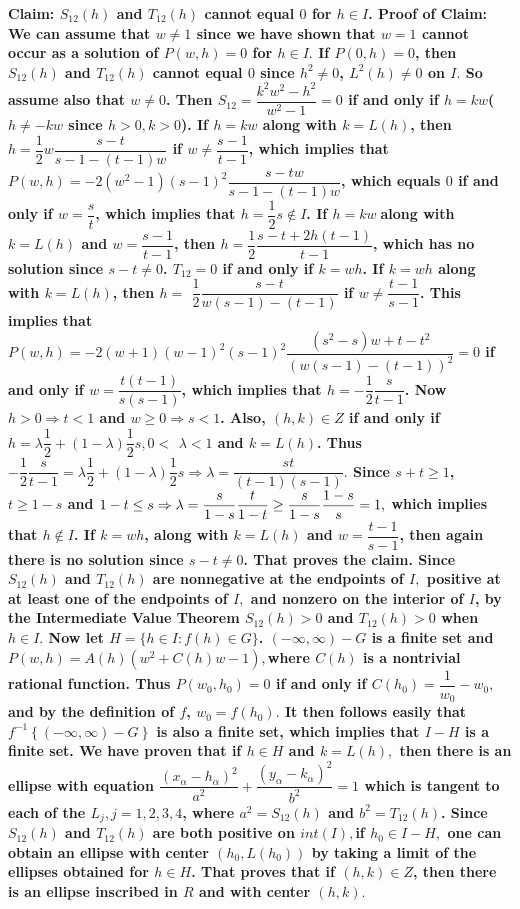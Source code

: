 \newline \bf Claim: \rm $S_{12}(h)$ and $T_{12}(h)$ cannot equal $0$ for $h\in I$. 
\newline \bf Proof of Claim: \rm We can assume that $w\neq 1$ since we have shown that $w=1$ \bf cannot \rm occur as a solution of $P(w,h)=0$ for $h\in I.$ If $P(0,h)=0$, then $S_{12}(h)$ and $T_{12}(h)$ cannot equal $0$ since $h^{2}\neq 0$, $L^{2}(h)\neq 0$ on $I.$ So assume also that $w\neq 0$. Then $S_{12}=\dfrac{k^{2}w^{2}-h^{2}}{w^{2}-1}=\allowbreak 0$ if and only if $h=kw$($h\neq -kw$ since $h>0,k>0$). If $h=kw$ along with $k=L(h)$, then $h=\dfrac{1}{2}w\dfrac{s-t}{s-1-(t-1)w}$ if $w\neq \dfrac{s-1}{t-1}$, which implies that $P(w,h)=-2(w^2-1) \left( s-1\right) ^{2}\dfrac{s-tw}{s-1-(t-1)w}$, which equals $0$ if and only if $w=\dfrac{s}{t}$, which implies that $h=\dfrac{1}{2}s\notin I$. If $h=kw\;$along with $k=L(h)$ and $w=\dfrac{s-1}{t-1}$, then $h=\dfrac{1}{2}\dfrac{s-t+2h(t-1)}{t-1}$, which has no solution since $s-t\neq 0$. $T_{12}=0$ if and only if $k=wh$. If $k=wh$ along with $k=L(h)$, then $h=\allowbreak $ $\dfrac{1}{2}\dfrac{s-t}{w(s-1)-(t-1)}$ if $w\neq \dfrac{t-1}{s-1}$. This implies that $P(w,h)=-2\left( w+1\right) \left( w-1\right) ^{2}\left( s-1\right) ^{2}\dfrac{(s^{2}-s)w+t-t^{2}}{\left( w(s-1)-(t-1)\right) ^{2}}=0$ if and only if $w=\dfrac{t(t-1)}{s(s-1)}$, which implies that $h=\allowbreak -\dfrac{1}{2}\dfrac{s}{t-1}$. Now $h>0\Rightarrow t<1$ and $w\geq 0\Rightarrow s<1$. Also, $(h,k)\in Z$ if and only if $h=\lambda \dfrac{1}{2}+(1-\lambda )\dfrac{1}{2}s,0<$ $\lambda <1$ and $k=L(h)$. Thus $-\dfrac{1}{2}\dfrac{s}{t-1}=\lambda \dfrac{1}{2}+(1-\lambda )\dfrac{1}{2}s\Rightarrow \lambda =\dfrac{s\allowbreak t}{\left( t-1\right) \left( s-1\right) }.$ Since $s+t\geq 1$, $t\geq 1-s$ and $1-t\leq s\Rightarrow \lambda =\dfrac{s\allowbreak }{1-s}\dfrac{\allowbreak t}{1-t}\geq \dfrac{s\allowbreak }{1-s}\dfrac{1-s}{s}=1,$ which implies that $h\notin I$. If $k=wh$, along with $k=L(h)$ and $w=\dfrac{t-1}{s-1}$, then again there is no solution since $s-t\neq 0$. That proves the claim. 
\newline Since $S_{12}(h)$ and $T_{12}(h)$ are nonnegative at the endpoints of $I,$ positive at at least one of the endpoints of $I,$ and nonzero on the interior of $I$, by the Intermediate Value Theorem $S_{12}(h)>0$ and $T_{12}(h)>0$ when $h\in I.$ Now let $H=\{h\in I:f(h)\in G\}$. $(-\infty ,\infty )-G$ is a finite set and $P(w,h)=A(h)(w^{2}+C(h)w-1),$where $C(h)$ is a nontrivial rational function. Thus $P(w_{0},h_{0})=0$ if and only if $C(h_{0})=\dfrac{1}{w_{0}}-w_{0},$ and by the definition of $f$, $w_{0}=f(h_{0}).$ It then follows easily that $f^{-1}\left\{ (-\infty ,\infty )-G\right\} $ is also a finite set, which implies that $I-H$ is a finite set. We have proven that if $h\in H$ and $k=L(h),$ then there is an ellipse with equation $\dfrac{(x_{\alpha }-h_{\alpha })^{2}}{a^{2}}+\dfrac{(y_{\alpha }-k_{\alpha })^{2}}{b^{2}}=1$ which is tangent to each of the $L_{j},j=1,2,3,4$, where $a^{2}=S_{12}(h)$ and $b^{2}=T_{12}(h)$. Since $S_{12}(h)$ and $T_{12}(h)$ are both positive on $int(I), $if $h_{0}\in I-H,$ one can obtain an ellipse with center $(h_{0},L(h_{0}))$ by taking a limit of the ellipses obtained for $h\in H$. That proves that if $(h,k)\in Z$, then there is an ellipse inscribed in $R$ and with center $(h,k).$ 
